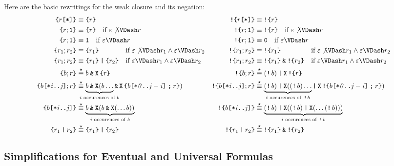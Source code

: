 \documentclass[a4paper,twoside,10pt,DIV=12]{scrreprt}
\DeclareMathOperator{\X}{\texttt{X}}
\newcommand{\M}{\mathbin{\texttt{M}}}
\newcommand{\W}{\mathbin{\texttt{W}}}
\DeclareMathOperator{\NOT}{\texttt{!}}
\newcommand{\OR}{\mathbin{\texttt{|}}}
\newcommand{\AND}{\mathbin{\texttt{\&}}}
\newcommand{\CONCAT}{\mathbin{\texttt{;}}}
\newcommand{\0}{\texttt{0}}
\newcommand{\1}{\texttt{1}}
\newcommand{\STAR}[1]{\texttt{[*#1]}}
\newcommand{\sere}[1]{\texttt{\{}#1\texttt{\}}}
\newcommand{\nsere}[1]{\texttt{!\{}#1\texttt{\}}}
\newcommand{\equiV}{\stackrel{\star}{\equiv}}
\def\clap#1{\hbox to 0pt{\hss#1\hss}}
\def\mathclap{\mathpalette\mathclapinternal}
\def\mathclapinternal#1#2{%
           \clap{$\mathsurround=0pt#1{#2}$}}
\newcommand\mvar[1]{\ensuremath{\mathit{#1}}}
\begin{document}
Here are the basic rewritings for the weak closure and its negation:
\begin{align*}
  \sere{r\STAR{}}&\equiv \sere{r}&
  \nsere{r\STAR{}}&\equiv \nsere{r}\\
  \sere{r;\1}&\equiv \sere{r} \quad\text{if~}\varepsilon\not\VDash r&
  \nsere{r;\1}&\equiv \nsere{r} \quad\text{if~}\varepsilon\not\VDash r\\
  \sere{r;\1}&\equiv \1 \quad\text{if~}\varepsilon\VDash r&
  \nsere{r;\1}&\equiv \0 \quad\text{if~}\varepsilon\VDash r\\
  \sere{r_1;r_2}&\equiv \sere{r_1}\phantom{{}\OR\sere{r_2}}\quad\text{if~}\varepsilon\not\VDash r_1\land\varepsilon\VDash r_2&
  \nsere{r_1;r_2}&\equiv \nsere{r_1}\phantom{{}\AND\nsere{r_2}}\quad\text{if~}\varepsilon\not\VDash r_1\land\varepsilon\VDash r_2\\
  \sere{r_1;r_2}&\equiv \sere{r_1}\OR\sere{r_2}\quad\text{if~}\varepsilon\VDash r_1\land\varepsilon\VDash r_2&
  \nsere{r_1;r_2}&\equiv \nsere{r_1}\AND\nsere{r_2}\quad\text{if~}\varepsilon\VDash r_1\land\varepsilon\VDash r_2\\
  \sere{b;r}&\equiV b\AND\X\sere{r}&
  \nsere{b;r}&\equiV (\NOT b)\OR\X\nsere{r}\\
  \sere{b\STAR{\mvar{i}..\mvar{j}};r}&\equiV \underbrace{b\AND \X(b\ldots}_{\mathclap{i\text{~occurences of~}b}}\AND\X\sere{b\STAR{\mvar{0}..\mvar{j-i}}\CONCAT r})&
  \nsere{b\STAR{\mvar{i}..\mvar{j}};r}&\equiV \underbrace{(\NOT b)\OR \X((\NOT b)\ldots}_{\mathclap{i\text{~occurences of~}\NOT b}}\OR\X\nsere{b\STAR{\mvar{0}..\mvar{j-i}}\CONCAT r}) \\
  \sere{b\STAR{\mvar{i}..\mvar{j}}}&\equiV \underbrace{b\AND \X(b\AND \X(\ldots b))}_{i\text{~occurences of~}b}&
  \nsere{b\STAR{\mvar{i}..\mvar{j}}}&\equiV \underbrace{(\NOT b)\OR \X((\NOT b)\OR \X(\ldots(\NOT b)))}_{i\text{~occurences of~}\NOT b}\\
  \sere{r_1\OR r_2}&\equiV\sere{r_1}\OR\sere{r_2} &
  \nsere{r_1\OR r_2}&\equiV\nsere{r_1}\AND\nsere{r_2}
\end{align*}

\subsection{Simplifications for Eventual and Universal Formulas}
\label{sec:eventunivrew}
\end{document}

